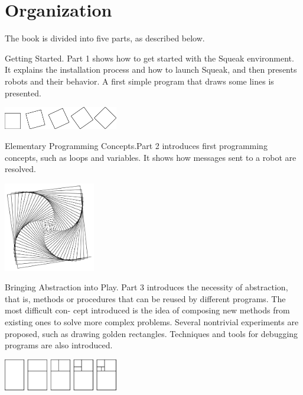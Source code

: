 \documentclass[a4paper,10pt,twoside]{book}
\begin{document}
\section*{Organization}


The book is divided into five parts, as described below. 

\begin{description}
	\item Getting Started. Part 1 shows how to get started with the Squeak environment. It explains 
the installation process and how to launch Squeak, and then presents robots and their 
behavior. A first simple program that draws some lines is presented. 
	\begin{center}
	\includegraphics[width=5cm]{1-ChTurntitlePicture}
	\end{center}
	
	\item Elementary Programming Concepts.Part 2 introduces first programming concepts, such 
	as loops and variables. It shows how messages sent to a robot are resolved. 
	
	\begin{center}
	\includegraphics[width=4cm]{2-varLoopsTitle}
	\end{center}
	
	\item Bringing Abstraction into Play. Part 3 introduces the necessity of abstraction, that is, 
	methods or procedures that can be reused by different programs. The most difficult con- 
	cept introduced is the idea of composing new methods from existing ones to solve more 
	complex problems. Several nontrivial experiments are proposed, such as drawing golden 
	rectangles. Techniques and tools for debugging programs are also introduced. 
	
	
	\begin{center}
	\includegraphics[width=5cm]{3-nborsteps}
	\end{center}
	

\end{description}
\end{document}
